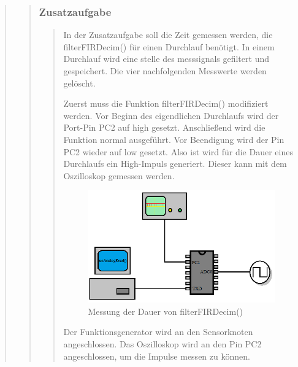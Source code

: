 \begin{quote}
\begin{quote}
\begin{quote}
			\end{quote}
			
			\subsubsection{Zusatzaufgabe}
			\begin{quote}
			
			In der Zusatzaufgabe soll die Zeit gemessen werden, die filterFIRDecim() für einen Durchlauf
            benötigt. In einem Durchlauf wird eine stelle des messsignals gefiltert und gespeichert. Die vier
            nachfolgenden Messwerte werden gelöscht.
			
			Zuerst muss die Funktion filterFIRDecim() modifiziert werden. Vor Beginn des eigendlichen
            Durchlaufs wird der Port-Pin PC2 auf high gesetzt. Anschließend wird die Funktion normal
            ausgeführt. Vor Beendigung wird der Pin PC2 wieder auf low gesetzt. Also ist wird für die
            Dauer eines Durchlaufs ein High-Impuls generiert. Dieser kann mit dem Oszilloskop gemessen
            werden.\\
            
            \begin{figure}[H]
            \centering
                \includegraphics[scale=0.7, trim = 0cm 0cm 0cm 0cm, clip]{./Bilder/Zusatz.png}
                    \caption{Messung der Dauer von filterFIRDecim()}
            \end{figure}
        
            Der Funktionsgenerator wird an den Sensorknoten angeschlossen. Das Oszilloskop wird an den  
            Pin PC2 angeschlossen, um die Impulse messen zu können.
        			
			\end{quote}
			
			\end{quote}%
		
\end{quote}%



